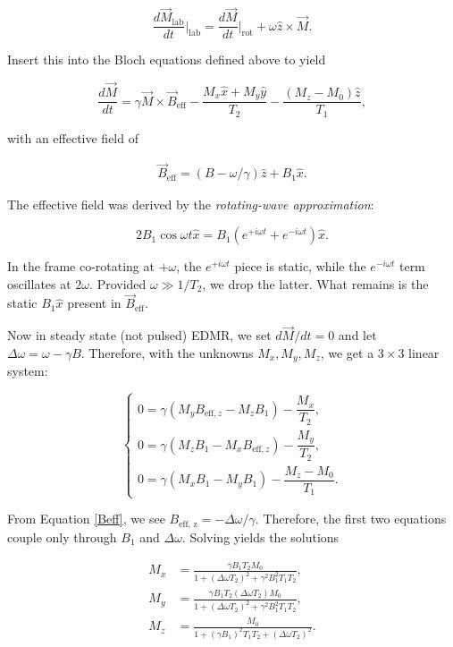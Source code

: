 \documentclass[svgnames]{article}
\begin{document}
\[
    \frac{d \vec{M}_\text{lab} }{d t} \Big|_\text{lab} = \frac{d \vec{M}}{dt}
    \Big|_\text{rot} + \omega \hat{z} \times \vec{M}.
\] \vspace{3px}

Insert this into the Bloch equations defined above to yield 

\[
\frac{d \vec{M}}{d t} = \gamma \vec{M} \times \vec{B}_\text{eff} - \frac{M_x
\hat{x} + M_y \hat{y}}{T_2} - \frac{(M_z - M_0) \hat{z}}{T_1}, 
\] \vspace{3px}

with an effective field of 

\begin{align} \label{Beff}
    \vec{B}_\text{eff}  = (B - \omega / \gamma) \hat{z} + B_1 \hat{x}. 
\end{align}

The effective field was derived by the \textit{rotating-wave approximation}: 

\[
    2B_1 \cos \omega t \hat{x} = B_1(e^{+i\omega t} + e^{-i\omega t} ) \hat{x}. 
\] \vspace{3px} 

In the frame co-rotating at $+\omega$, the $e^{+i\omega t}$ piece is static,
while the $e^{-i\omega t}$ term oscillates at $2\omega$. Provided $\omega \gg
1/T_2$, we drop the latter. What remains is the static $B_1 \hat{x}$ present in
$\vec{B}_\text{eff}$. 

Now in steady state (not pulsed) EDMR, we set $d\vec{M} / dt = 0$ and let
$\Delta \omega = \omega - \gamma B.$ Therefore, with the unknowns $M_x, M_y,
M_z$, we get a $3 \times 3$ linear system: 

\[
\begin{cases}
    0 = \gamma \left( M_y B_{\text{eff}, z} - M_z B_1 \right) - \dfrac{M_x}{T_2}, \\ 
    0 = \gamma \left( M_z B_1 - M_x B_{\text{eff}, z} \right) - \dfrac{M_y}{T_2}, \\ 
    0 = \gamma \left( M_x B_1 - M_y B_1 \right) - \dfrac{M_z - M_0}{T_1}.
\end{cases}
\] \vspace{3px}

From Equation \ref{Beff}, we see $B_\text{eff, z} = -\Delta \omega / \gamma$.
Therefore, the first two equations couple only through $B_1$ and $\Delta
\omega$. Solving yields the solutions 

\begin{align}
    M_x &= \frac{\gamma B_1 T_2 M_0}{1 + (\Delta \omega T_2)^2 + \gamma^2 B_1^2
  T_1T_2}, \\ 
        M_y &= \frac{\gamma B_1 T_2 (\Delta \omega T_2) M_0}{1 + (\Delta \omega
        T_2)^2 + \gamma^2 B_1^2 T_1T_2}, \\ 
            M_z &= \frac{M_0}{1 + (\gamma B_1)^2 T_1T_2 + (\Delta \omega
            T_2)^2}.
\end{align} \vspace{3px}
\end{document}
